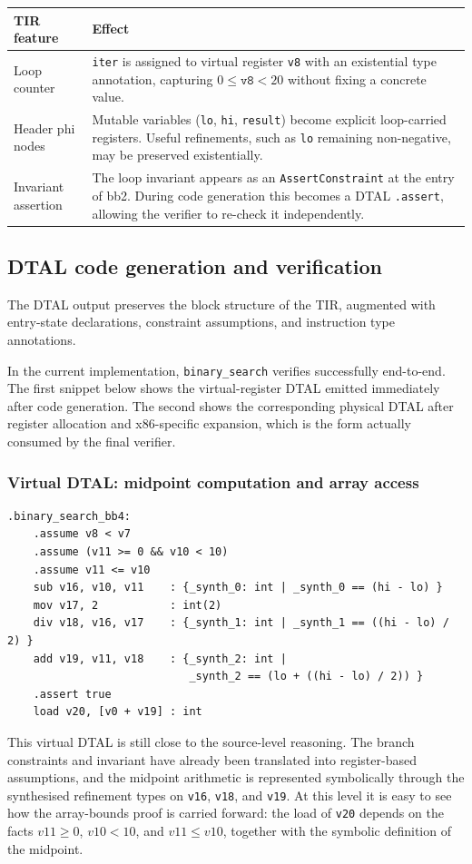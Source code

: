 \begin{center}
\small
\begin{tabularx}{0.96\textwidth}{>{\raggedright\arraybackslash}p{} >{\raggedright\arraybackslash}X}
\toprule
\textbf{TIR feature} & \textbf{Effect} \\
\midrule
Loop counter & \texttt{iter} is assigned to virtual register \texttt{v8} with an existential type annotation, capturing $0 \le \texttt{v8} < 20$ without fixing a concrete value. \\
Header phi nodes & Mutable variables (\texttt{lo}, \texttt{hi}, \texttt{result}) become explicit loop-carried registers. Useful refinements, such as \texttt{lo} remaining non-negative, may be preserved existentially. \\
Invariant assertion & The loop invariant appears as an \texttt{AssertConstraint} at the entry of bb2. During code generation this becomes a DTAL \texttt{.assert}, allowing the verifier to re-check it independently. \\
\bottomrule
\end{tabularx}
\end{center}

\subsection{DTAL code generation and verification}
The DTAL output preserves the block structure of the TIR, augmented with entry-state declarations, constraint assumptions, and instruction type annotations.

In the current implementation, \texttt{binary\_search} verifies successfully end-to-end. The first snippet below shows the virtual-register DTAL emitted immediately after code generation. The second shows the corresponding physical DTAL after register allocation and x86-specific expansion, which is the form actually consumed by the final verifier.
\subsubsection{Virtual DTAL: midpoint computation and array access}
\begin{verbatim}
.binary_search_bb4:
    .assume v8 < v7
    .assume (v11 >= 0 && v10 < 10)
    .assume v11 <= v10
    sub v16, v10, v11    : {_synth_0: int | _synth_0 == (hi - lo) }
    mov v17, 2           : int(2)
    div v18, v16, v17    : {_synth_1: int | _synth_1 == ((hi - lo) / 2) }
    add v19, v11, v18    : {_synth_2: int |
                            _synth_2 == (lo + ((hi - lo) / 2)) }
    .assert true
    load v20, [v0 + v19] : int
\end{verbatim}
This virtual DTAL is still close to the source-level reasoning. The branch constraints and invariant have already been translated into register-based assumptions, and the midpoint arithmetic is represented symbolically through the synthesised refinement types on \texttt{v16}, \texttt{v18}, and \texttt{v19}. At this level it is easy to see how the array-bounds proof is carried forward: the load of \texttt{v20} depends on the facts $v11 \ge 0$, $v10 < 10$, and $v11 \le v10$, together with the symbolic definition of the midpoint.
